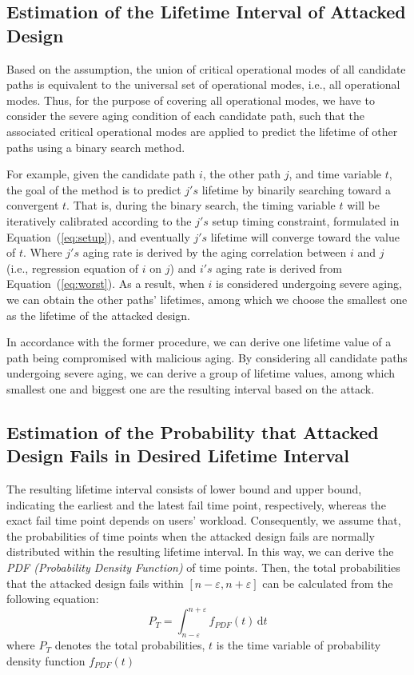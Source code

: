 \subsection{Estimation of the Lifetime Interval of Attacked Design}
Based on the assumption, the union of critical operational modes of all candidate paths is equivalent to the universal set of operational modes, i.e., all operational modes. Thus, for the purpose of covering all operational modes, we have to consider the severe aging condition of each candidate path, such that the associated critical operational modes are applied to predict the lifetime of other paths using a binary search method.

For example, given the candidate path $i$, the other path $j$, and time variable $t$, the goal of the method is to predict $j's$ lifetime by binarily searching toward a convergent $t$. That is, during the binary search, the timing variable $t$ will be iteratively calibrated according to the $j's$ setup timing constraint, formulated in Equation~(\ref{eq:setup}), and eventually $j's$ lifetime will converge toward the value of $t$. Where $j's$ aging rate is derived by the aging correlation between $i$ and $j$ (i.e., regression equation of $i$ on $j$) and $i's$ aging rate is derived from Equation~(\ref{eq:worst}). 
As a result, when $i$ is considered undergoing severe aging, we can obtain the other paths' lifetimes, among which we choose the smallest one as the lifetime of the attacked design.

In accordance with the former procedure, we can derive one lifetime value of a path being compromised with malicious aging. By considering all candidate paths undergoing severe aging, we can derive a group of lifetime values, among which smallest one and biggest one are the resulting interval based on the attack.
\subsection{Estimation of the Probability that Attacked Design Fails in Desired Lifetime Interval}
The resulting lifetime interval consists of lower bound and upper bound, indicating the earliest and the latest fail time point, respectively, whereas the exact fail time point depends on users' workload. Consequently, we assume that, the probabilities of time points when the attacked design fails are normally distributed within the resulting lifetime interval. In this way, we can derive the \textit{PDF (Probability Density Function)} of time points. Then, the total probabilities that the attacked design fails within $[n-\varepsilon, n+\varepsilon]$ can be calculated from the following equation:
\begin{equation}
	\label{eq:pdf}
		P_{T} = \int_{n-\varepsilon}^{n+\varepsilon} f_{PDF}(t) \,\mathrm{d}t
\end{equation}
where $P_{T}$ denotes the total probabilities, $t$ is the time variable of probability density function $f_{PDF}(t)$

  
